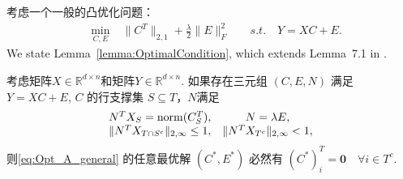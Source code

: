 \documentclass[main.tex]{subfiles}
\begin{document}
考虑一个一般的凸优化问题：
\begin{align}\label{eq:Opt_A_general}
  \quad \min_{C, E} \; &\|C^T\|_{2,1}+\frac{\lambda}{2}\|E\|^2_F \quad &s.t. \quad Y=XC+E.
\end{align}
We state Lemma~\ref{lemma:OptimalCondition}, which extends Lemma~7.1 in \cite{soltanolkotabi2011geometric}.
\begin{lemma}\label{lemma:OptimalCondition}
  考虑矩阵$X\in \mathbb{R}^{d\times n}$和矩阵$Y \in \mathbb{R}^{d\times n}$.
  如果存在三元组 $(C,E,N)$ 满足 $Y=XC+E$, $C$ 的行支撑集 $S\subseteq T$，$N$满足
  \begin{equation*}
    \begin{array}{cc}
      N^T X_S = \mathrm{norm}(C_S^T),  & N=\lambda E, \\
      \|N^T X_{T\cap S^{c}}\|_{2, \infty} \leq 1, & \|N^T X_{T^{c}}\|_{2, \infty}<1,
    \end{array}
  \end{equation*}
  则\eqref{eq:Opt_A_general} 的任意最优解 $(C^{*},E^{*})$ 必然有
  $(C^{*})^T_i=\mathbf{0} \quad \forall i \in T^c$.
\end{lemma}
\end{document}
